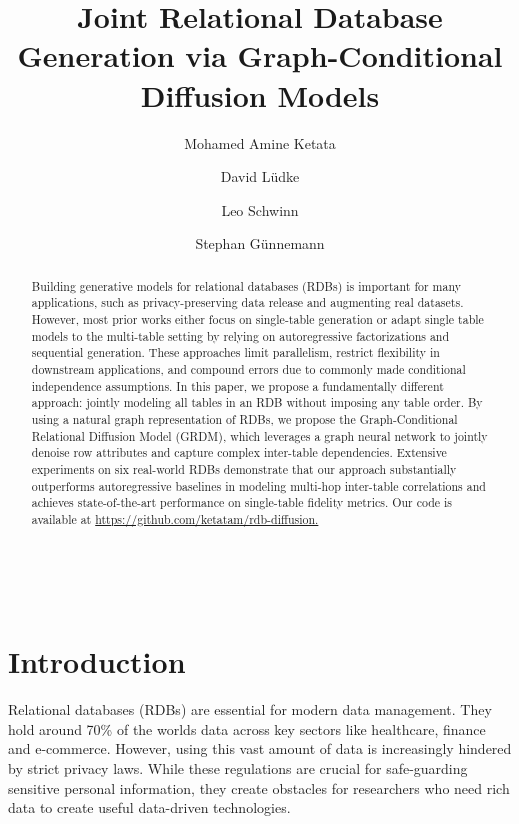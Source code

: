 \documentclass[manuscript,review]{acmart}
\title{Joint Relational Database Generation via Graph-Conditional Diffusion Models}
\begin{document}
\author{Mohamed Amine Ketata}

\author{David Lüdke}\

\author{Leo Schwinn}

\author{Stephan Günnemann}

\begin{abstract}
    Building generative models for relational databases (RDBs) is important for many applications, such as privacy-preserving data release and augmenting real datasets. However, most prior works either focus on single-table generation or adapt single table models to the multi-table setting by relying on autoregressive factorizations and sequential generation. These approaches limit parallelism, restrict flexibility in downstream applications, and compound errors due to commonly made conditional independence assumptions. In this paper, we propose a fundamentally different approach: jointly modeling all tables in an RDB without imposing any table order. By using a natural graph representation of RDBs, we propose the Graph-Conditional Relational Diffusion Model (GRDM), which leverages a graph neural network to jointly denoise row attributes and capture complex inter-table dependencies. Extensive experiments on six real-world RDBs demonstrate that our approach substantially outperforms autoregressive baselines in modeling multi-hop inter-table correlations and achieves state-of-the-art performance on single-table fidelity metrics. Our code is available at \url{https://github.com/ketatam/rdb-diffusion.}
\end{abstract}

\maketitle

\section{Introduction}
Relational databases (RDBs) are essential for modern data management. They hold around 70\% of the worlds data\cite{dbengines2023} across key sectors like healthcare, finance and e-commerce\cite{PhysioNet-mimiciii-1.4}. However, using this vast amount of data is increasingly hindered by strict privacy laws. While these regulations are crucial for safe-guarding sensitive personal information, they create obstacles for researchers who need rich data to create useful data-driven technologies.
\end{document}
